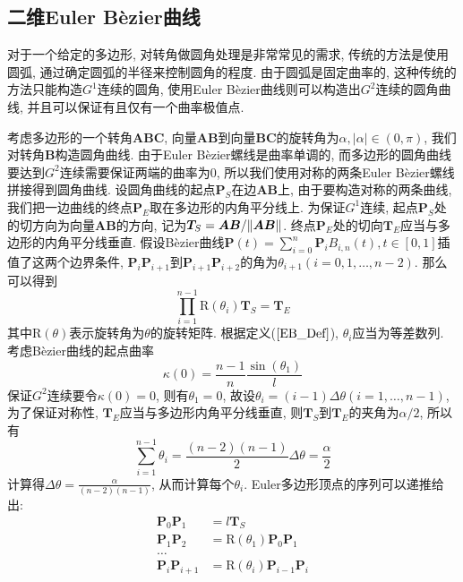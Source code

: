 \documentclass[utf8]{ctexart} %
\begin{document}
		\subsection{二维Euler B\`{e}zier曲线}
		对于一个给定的多边形, 对转角做圆角处理是非常常见的需求, 传统的方法是使用圆弧, 通过确定圆弧的半径来控制圆角的程度. 由于圆弧是固定曲率的, 这种传统的方法只能构造$G^1$连续的圆角, 使用Euler B\`{e}zier曲线则可以构造出$G^2$连续的圆角曲线, 并且可以保证有且仅有一个曲率极值点.\par
		考虑多边形的一个转角$\boldsymbol{ABC}$, 向量$\boldsymbol{AB}$到向量$\boldsymbol{BC}$的旋转角为$\alpha, |\alpha|\in(0,\pi)$, 我们对转角$\boldsymbol{B}$构造圆角曲线. 由于Euler B\`{e}zier螺线是曲率单调的, 而多边形的圆角曲线要达到$G^2$连续需要保证两端的曲率为0, 所以我们使用对称的两条Euler B\`{e}zier螺线拼接得到圆角曲线. 设圆角曲线的起点$\boldsymbol{P}_S$在边$\boldsymbol{AB}$上, 由于要构造对称的两条曲线, 我们把一边曲线的终点$\boldsymbol{P}_E$取在多边形的内角平分线上. 为保证$G^1$连续, 起点$\boldsymbol{P}_S$处的切方向为向量$\boldsymbol{AB}$的方向, 记为$\boldsymbol{T}_S = \boldsymbol{AB}/\Arrowvert\boldsymbol{AB}\Arrowvert$. 终点$\boldsymbol{P}_E$处的切向$\boldsymbol{T}_E$应当与多边形的内角平分线垂直. 假设B\`ezier曲线$\boldsymbol{P}(t)=\sum_{i=0}^n\boldsymbol{P}_iB_{i,n}(t),t\in[0,1]$插值了这两个边界条件, $\boldsymbol{P}_i\boldsymbol{P}_{i+1}$到$\boldsymbol{P}_{i+1}\boldsymbol{P}_{i+2}$的角为$\theta_{i+1}(i=0,1,\dots,n-2)$. 那么可以得到
		\begin{equation}
			\prod_{i=1}^{n-1}\text{R}(\theta_i)\boldsymbol{T}_S =  \boldsymbol{T}_E
		\end{equation}
		其中$\text{R}(\theta)$表示旋转角为$\theta$的旋转矩阵. 根据定义($\ref{EB_Def}$), $\theta_i$应当为等差数列. 考虑B\`ezier曲线的起点曲率$$\kappa(0)=\frac{n-1}{n}\frac{\sin(\theta_1)}{l}$$
		保证$G^2$连续要令$\kappa(0)=0$, 则有$\theta_1=0$, 故设$\theta_i=(i-1)\Delta\theta(i=1,\dots,n-1)$, 为了保证对称性, $\boldsymbol{T}_E$应当与多边形内角平分线垂直, 则$\boldsymbol{T}_S$到$\boldsymbol{T}_E$的夹角为$\alpha/2$, 所以有
		\begin{equation}
			\sum_{i=1}^{n-1}\theta_i = \frac{(n-2)(n-1)}2\Delta\theta = \frac{\alpha}2
		\end{equation}
		计算得$\Delta\theta=\frac{\alpha}{(n-2)(n-1)}$, 从而计算每个$\theta_i$. Euler多边形顶点的序列可以递推给出:
		\begin{equation}\label{recur}
			\begin{aligned}
				\boldsymbol{P}_0\boldsymbol{P}_1 &=l\boldsymbol{T}_S\\
				\boldsymbol{P}_1\boldsymbol{P}_2 &=\text{R}(\theta_1)\boldsymbol{P}_0\boldsymbol{P}_1\\
				\dots\\
				\boldsymbol{P}_i\boldsymbol{P}_{i+1} &=\text{R}(\theta_i)\boldsymbol{P}_{i-1}\boldsymbol{P}_i
			\end{aligned}
		\end{equation}
\end{document}
